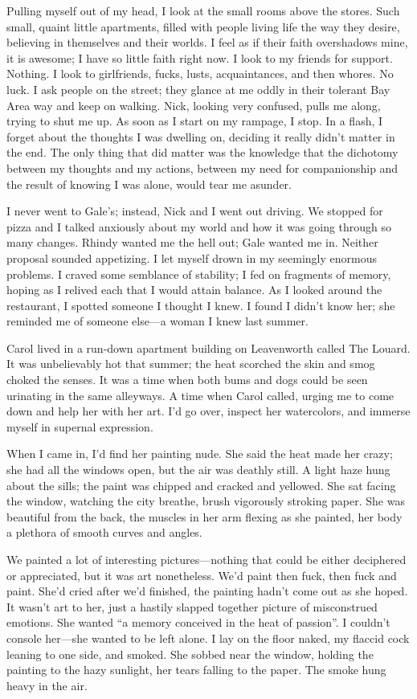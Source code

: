 Pulling myself out of my head, I look at the small rooms above the
stores. Such small, quaint little apartments, filled with people living
life the way they desire, believing in themselves and their worlds. I
feel as if their faith overshadows mine, it is awesome; I have so little
faith right now. I look to my friends for support. Nothing. I look to
girlfriends, fucks, lusts, acquaintances, and then whores. No luck. I
ask people on the street; they glance at me oddly in their tolerant Bay
Area way and keep on walking. Nick, looking very confused, pulls me
along, trying to shut me up. As soon as I start on my rampage, I stop.
In a flash, I forget about the thoughts I was dwelling on, deciding it
really didn't matter in the end. The only thing that did matter was the
knowledge that the dichotomy between my thoughts and my actions, between
my need for companionship and the result of knowing I was alone, would
tear me asunder.

I never went to Gale's; instead, Nick and I went out driving. We stopped
for pizza and I talked anxiously about my world and how it was going
through so many changes. Rhindy wanted me the hell out; Gale wanted me
in. Neither proposal sounded appetizing. I let myself drown in my
seemingly enormous problems. I craved some semblance of stability; I fed
on fragments of memory, hoping as I relived each that I would attain
balance. As I looked around the restaurant, I spotted someone I thought
I knew. I found I didn't know her; she reminded me of someone else---a
woman I knew last summer.

Carol lived in a run-down apartment building on Leavenworth called The
Louard. It was unbelievably hot that summer; the heat scorched the skin
and smog choked the senses. It was a time when both bums and dogs could
be seen urinating in the same alleyways. A time when Carol called,
urging me to come down and help her with her art. I'd go over, inspect
her watercolors, and immerse myself in supernal expression.

When I came in, I'd find her painting nude. She said the heat made her
crazy; she had all the windows open, but the air was deathly still. A
light haze hung about the sills; the paint was chipped and cracked and
yellowed. She sat facing the window, watching the city breathe, brush
vigorously stroking paper. She was beautiful from the back, the muscles
in her arm flexing as she painted, her body a plethora of smooth curves
and angles.

We painted a lot of interesting pictures---nothing that could be either
deciphered or appreciated, but it was art nonetheless. We'd paint then
fuck, then fuck and paint. She'd cried after we'd finished, the painting
hadn't come out as she hoped. It wasn't art to her, just a hastily
slapped together picture of misconstrued emotions. She wanted ``a memory
conceived in the heat of passion''. I couldn't console her---she wanted
to be left alone. I lay on the floor naked, my flaccid cock leaning to
one side, and smoked. She sobbed near the window, holding the painting
to the hazy sunlight, her tears falling to the paper. The smoke hung
heavy in the air.


